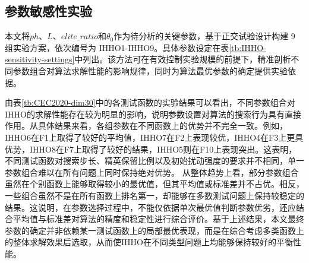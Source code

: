 \documentclass{wzuthesis}
\begin{document}
\subsection{参数敏感性实验}

本文将$ph$、$L$、$elite\_ratio$和$\theta_0$作为待分析的关键参数，基于正交试验设计构建 9 组实验方案，依次编号为 IHHO1-IHHO9。具体参数设定在表\ref{tb:IHHO-sensitivity-settings}中列出。该方法可在有效控制实验规模的前提下，精准剖析不同参数组合对算法求解性能的影响规律，同时为算法最优参数的确定提供实验依据。

由表\ref{tb:CEC2020-dim30}中的各测试函数的实验结果可以看出，不同参数组合对IHHO的求解性能存在较为明显的影响，说明参数设置对算法的搜索行为具有直接作用。从具体结果来看，各组参数在不同函数上的优势并不完全一致。例如，IHHO6在F1上取得了较好的平均值，IHHO7在F2上表现较优，IHHO4在F3上更具优势，IHHO8在F7上取得了较好的结果，IHHO5则在F10上表现突出。这表明，不同测试函数对搜索步长、精英保留比例以及初始扰动强度的要求并不相同，单一参数组合难以在所有问题上同时保持绝对优势。
从整体趋势上看，部分参数组合虽然在个别函数上能够取得较小的最优值，但其平均值或标准差并不占优。相反，一些组合虽然不是在所有函数上排名第一，却能够在多数测试问题上保持较稳定的结果。这说明，在参数选择过程中，不能仅依据单次最优值判断参数优劣，还应结合平均值与标准差对算法的精度和稳定性进行综合评价。基于上述结果，本文最终参数的确定并非依赖某一测试函数上的局部最优表现，而是在综合考虑多类函数上的整体求解效果后选取，从而使IHHO在不同类型问题上均能够保持较好的平衡性能。


\end{document}
